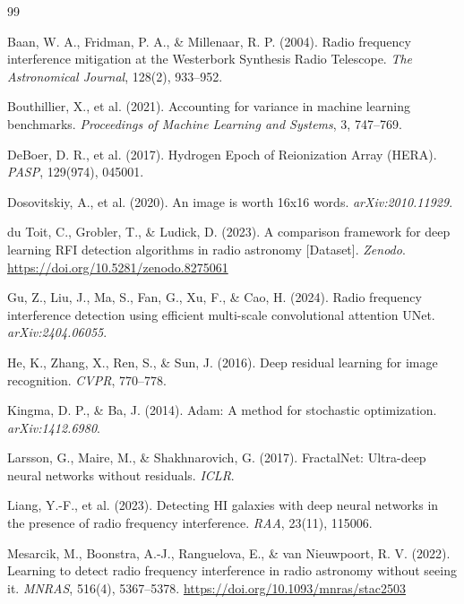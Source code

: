 \documentclass[11pt]{article}
\begin{document}
\begin{thebibliography}{99}

 Baan, W. A., Fridman, P. A., \& Millenaar, R. P. (2004). Radio frequency interference mitigation at the Westerbork Synthesis Radio Telescope. \emph{The Astronomical Journal}, 128(2), 933--952.

 Bouthillier, X., et al. (2021). Accounting for variance in machine learning benchmarks. \emph{Proceedings of Machine Learning and Systems}, 3, 747--769.

 DeBoer, D. R., et al. (2017). Hydrogen Epoch of Reionization Array (HERA). \emph{PASP}, 129(974), 045001.

 Dosovitskiy, A., et al. (2020). An image is worth 16x16 words. \emph{arXiv:2010.11929}.

 du Toit, C., Grobler, T., \& Ludick, D. (2023). A comparison framework for deep learning RFI detection algorithms in radio astronomy [Dataset]. \emph{Zenodo}. \url{https://doi.org/10.5281/zenodo.8275061}

 Gu, Z., Liu, J., Ma, S., Fan, G., Xu, F., \& Cao, H. (2024). Radio frequency interference detection using efficient multi-scale convolutional attention UNet. \emph{arXiv:2404.06055}.

 He, K., Zhang, X., Ren, S., \& Sun, J. (2016). Deep residual learning for image recognition. \emph{CVPR}, 770--778.

 Kingma, D. P., \& Ba, J. (2014). Adam: A method for stochastic optimization. \emph{arXiv:1412.6980}.

 Larsson, G., Maire, M., \& Shakhnarovich, G. (2017). FractalNet: Ultra-deep neural networks without residuals. \emph{ICLR}.

 Liang, Y.-F., et al. (2023). Detecting HI galaxies with deep neural networks in the presence of radio frequency interference. \emph{RAA}, 23(11), 115006.

 Mesarcik, M., Boonstra, A.-J., Ranguelova, E., \& van Nieuwpoort, R. V. (2022). Learning to detect radio frequency interference in radio astronomy without seeing it. \emph{MNRAS}, 516(4), 5367--5378. \url{https://doi.org/10.1093/mnras/stac2503}


\end{thebibliography}
\end{document}
